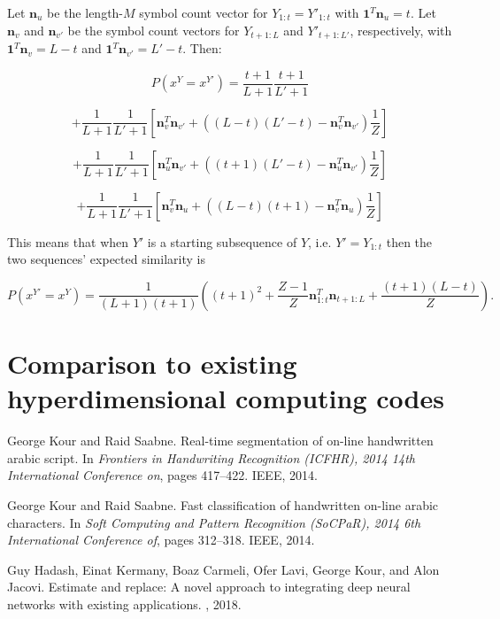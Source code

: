 \documentclass{article}
\begin{document}
Let $\mathbf{n}_u$ be the length-$M$ symbol count vector for $Y_{1:t} = Y'_{1:t}$ with $\mathbf{1}^T\mathbf{n}_u = t$. Let $\mathbf{n}_v$ and $\mathbf{n}_{v'}$ be the symbol count vectors for $Y_{t+1:L}$ and $Y'_{t+1:L'}$, respectively, with $\mathbf{1}^T\mathbf{n}_{v} = L - t$ and $\mathbf{1}^T\mathbf{n}_{v'} = L' - t$. Then:

$$P(x^Y = x^{Y'}) = \frac{t+1}{L+1}\frac{t+1}{L'+1}$$

$$+ \frac{1}{L+1}\frac{1}{L'+1}\left[\mathbf{n}^T_v\mathbf{n}_{v'} + \left((L-t)(L'-t) - \mathbf{n}^T_v\mathbf{n}_{v'} \right)\frac{1}{Z}\right]
$$

$$+\frac{1}{L+1}\frac{1}{L'+1}\left[
\mathbf{n}^T_{u}\mathbf{n}_{v'} + \left((t+1)(L'-t) - \mathbf{n}^T_{u}\mathbf{n}_{v'} \right)\frac{1}{Z}
\right]
$$

$$+\frac{1}{L+1}\frac{1}{L'+1}\left[
\mathbf{n}^T_{v}\mathbf{n}_{u} + \left((L-t)(t+1) - \mathbf{n}^T_{v}\mathbf{n}_{u} \right)\frac{1}{Z}
\right]
$$

This means that when $Y'$ is a starting subsequence of $Y$, i.e. $Y' = Y_{1:t}$ then the two sequences' expected similarity is

$$P(x^{Y'} = x^Y) = \frac{1}{(L+1)(t+1)}\left((t+1)^2 + \frac{Z-1}{Z}\mathbf{n}^T_{1:t}\mathbf{n}_{t+1:L} + \frac{(t+1)(L-t)}{Z}\right).$$

\section{Comparison to existing hyperdimensional computing codes}




  


\begin{thebibliography}{1}

George Kour and Raid Saabne.
\newblock Real-time segmentation of on-line handwritten arabic script.
\newblock In {\em Frontiers in Handwriting Recognition (ICFHR), 2014 14th
  International Conference on}, pages 417--422. IEEE, 2014.

George Kour and Raid Saabne.
\newblock Fast classification of handwritten on-line arabic characters.
\newblock In {\em Soft Computing and Pattern Recognition (SoCPaR), 2014 6th
  International Conference of}, pages 312--318. IEEE, 2014.

Guy Hadash, Einat Kermany, Boaz Carmeli, Ofer Lavi, George Kour, and Alon
  Jacovi.
\newblock Estimate and replace: A novel approach to integrating deep neural
  networks with existing applications.
, 2018.

\end{thebibliography}
\end{document}
